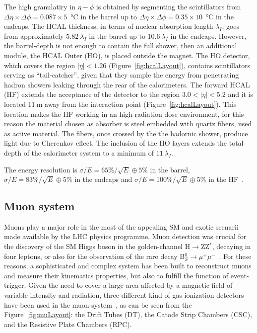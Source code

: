 The high granulatiry in $\eta-\phi$ is obtained by segmenting the scintillators 
from $\Delta\eta\times\Delta\phi=0.087\times5$~\si{\degreeCelsius} in the barrel up to 
$\Delta\eta\times\Delta\phi=0.35\times10$~\si{\degreeCelsius} in the endcaps.
The HCAL thickness, in terms of nuclear absorption length $\lambda_I$, goes from approximately 
$5.82~\lambda_I$ in the barrel up to $10.6~\lambda_I$ in the endcaps. However, the barrel-depth is not enough to 
contain the full shower, then an additional module, the HCAL Outer (HO), is placed
outside the magnet. The HO detector, which covers the region $|\eta|<1.26$ (Figure~\ref{fig:hcalLayout}), 
contains scintillators serving as ``tail-catcher'', given that they sample the energy from penetrating hadron showers 
leaking through the rear of the calorimeters. The forward HCAL (HF) extends the acceptance of the 
detector to the region $3.0<|\eta|<5.2$ and it is located $11~\si{\m}$ away from the interaction point 
(Figure~\ref{fig:hcalLayout}). This location makes the HF working in an high-radiation dose environment, 
for this reason the material chosen as absorber is steel embedded with quartz fibers, used as active material. 
The fibers, once crossed by the the hadornic shower, produce light due to Cherenkov effect.
The inclusion of the HO layers extends the total depth of the calorimeter system to a minimum of $11~\lambda_I$.

The energy resolution is $\sigma/E=65\%/\sqrt{E}\oplus5\%$ in the barrel, $\sigma/E=83\%/\sqrt{E}\oplus5\%$
in the endcaps and $\sigma/E=100\%/\sqrt{E}\oplus5\%$ in the HF~\cite{hcalTDR}.

\subsection{Muon system}
\label{subsec:muonsys}

Muons play a major role in the most of the appealing SM and exotic scenarii made available by the 
LHC physics programme. Muon detection was crucial for the discovery of the SM Higgs boson in the golden-channel
H$\rightarrow$ZZ$^*$, decaying in four leptons, or also for the observation of the rare decay 
B$^0_S\rightarrow\mu^+\mu^-$~\cite{CMS:2014xfa}.
For these reasons, a sophisticated and complex system has been built to reconstruct muons and 
measure their kinematics properties, but also to fulfill the function of event-trigger.
Given the need to cover a large area affected by a magnetic field of variable intensity and 
radiation, three different kind of gas-ionization detectors have been used in the muon system~\cite{CMS:1997dma},
as can be seen from the Figure~\ref{fig:muLayout}: the Drift Tubes (DT), the Catode Strip Chambers (CSC), 
and the Resistive Plate Chambers (RPC).


